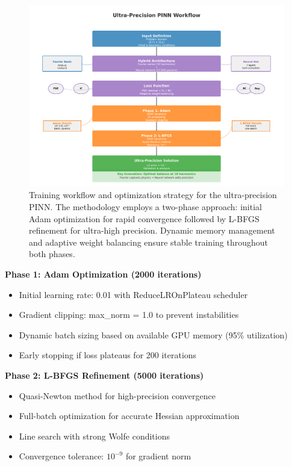 \begin{figure}[ht]
    \centering
    \includegraphics[width=\linewidth]{figures/workflow_diagram.png}
    \caption{Training workflow and optimization strategy for the ultra-precision PINN. The methodology employs a two-phase approach: initial Adam optimization for rapid convergence followed by L-BFGS refinement for ultra-high precision. Dynamic memory management and adaptive weight balancing ensure stable training throughout both phases.}
    \label{fig:workflow}
\end{figure}

\textbf{Phase 1: Adam Optimization (2000 iterations)}
\begin{itemize}
    \item Initial learning rate: 0.01 with ReduceLROnPlateau scheduler \cite{kingma2014adam}
    \item Gradient clipping: max\_norm = 1.0 to prevent instabilities
    \item Dynamic batch sizing based on available GPU memory (95\% utilization)
    \item Early stopping if loss plateaus for 200 iterations
\end{itemize}

\textbf{Phase 2: L-BFGS Refinement (5000 iterations)}
\begin{itemize}
    \item Quasi-Newton method for high-precision convergence \cite{liu1989limited}
    \item Full-batch optimization for accurate Hessian approximation
    \item Line search with strong Wolfe conditions
    \item Convergence tolerance: $10^{-9}$ for gradient norm
\end{itemize}

